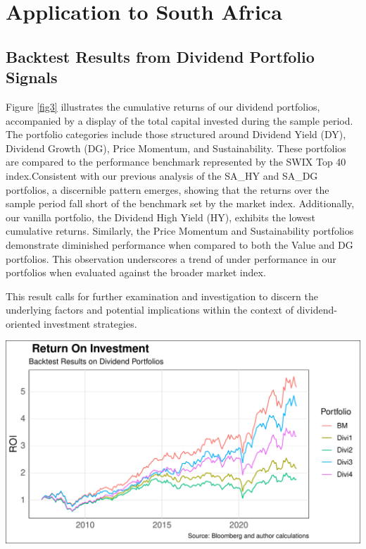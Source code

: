 \documentclass[11pt,preprint, authoryear]{elsarticle}
\let\origfigure\figure
\let\endorigfigure\endfigure
\renewenvironment{figure}[1][2] {
    \expandafter\origfigure\expandafter[H]
} {
    \endorigfigure
}
\numberwithin{equation}{section}
\numberwithin{figure}{section}
\numberwithin{table}{section}
\begin{document}
\hypertarget{application-to-south-africa}{%
\section*{Application to South
Africa}\label{application-to-south-africa}}

\hypertarget{backtest-results-from-dividend-portfolio-signals}{%
\subsection*{Backtest Results from Dividend Portfolio
Signals}\label{backtest-results-from-dividend-portfolio-signals}}

Figure \ref{fig3} illustrates the cumulative returns of our dividend
portfolios, accompanied by a display of the total capital invested
during the sample period. The portfolio categories include those
structured around Dividend Yield (DY), Dividend Growth (DG), Price
Momentum, and Sustainability. These portfolios are compared to the
performance benchmark represented by the SWIX Top 40 index.Consistent
with our previous analysis of the SA\_HY and SA\_DG portfolios, a
discernible pattern emerges, showing that the returns over the sample
period fall short of the benchmark set by the market index.
Additionally, our vanilla portfolio, the Dividend High Yield (HY),
exhibits the lowest cumulative returns. Similarly, the Price Momentum
and Sustainability portfolios demonstrate diminished performance when
compared to both the Value and DG portfolios. This observation
underscores a trend of under performance in our portfolios when
evaluated against the broader market index.

This result calls for further examination and investigation to discern
the underlying factors and potential implications within the context of
dividend-oriented investment strategies.

\begin{figure}[H]

\includegraphics{Much_Ado_About_Dividends_files/figure-latex/Figure3-1} \hfill{}

\caption{Rolling 3 Year Returns \label{fig3}}\label{fig:Figure3}
\end{figure}
\end{document}
